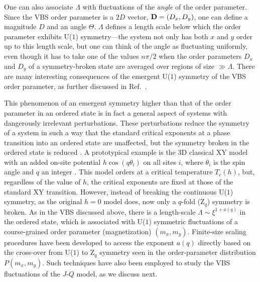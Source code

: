 \documentclass[range]{ar2e}
\begin{document}
One can also associate $\Lambda$ with fluctuations of the {\it angle} of the order parameter. Since the VBS order parameter is a $2D$ vector, ${\bf D}= (D_x,D_y)$, 
one can define a magnitude $D$ and an angle $\Theta$. $\Lambda$ defines a length scale below which the order parameter exhibits U($1$) symmetry---the system
not only has both $x$ and $y$ order up to this length scale, but one can think of the angle as fluctuating uniformly, even though it has to take one of the 
values $n\pi/2$ when the order parameters $D_x$ and $D_y$ of a symmetry-broken state are averaged over regions of size $\gg \Lambda$. There are many interesting 
consequences of the emergent U($1$) symmetry of the VBS order parameter, as further discussed in Ref.~\cite{Sandvik12}.

This phenomenon of an emergent symmetry higher than that of the order parameter in an ordered state is in fact a general aspect of systems with 
dangerously irrelevant perturbations. These perturbations reduce the symmetry of a system in such a way that the standard critical exponents 
at a phase transition into an ordered state are unaffected, but the symmetry broken in the ordered state is reduced \cite{Jose77,Oshikawa00}. A 
prototypical example is the 3D classical XY model with an added on-site potential $h\cos(q\theta_i)$ on all sites $i$, where $\theta_i$ is the spin 
angle and $q$ an integer \cite{Carmona00}. This model orders at a critical temperature $T_c(h)$, but, regardless of the value of $h$, the critical exponents 
are fixed at those of the standard XY transition. However, instead of breaking the continuous U($1$) symmetry, as the original $h=0$ model does, 
now only a $q$-fold (Z$_q$) symmetry is broken. As in the VBS discussed above, there is a length-scale $\Lambda \sim \xi^{1+a(q)}$ in the ordered state, which 
is associated with U($1$) symmetric fluctuations of a course-grained order parameter (magnetization) $(m_x,m_y)$. Finite-size scaling procedures have been 
developed \cite{Lou07} to access the exponent $a(q)$ directly based on the cross-over from U($1$) to Z$_q$ symmetry seen in the order-parameter distribution 
$P(m_x,m_y)$. Such techniques have also been employed to study the VBS fluctuations of the $J$-$Q$ model, as we discuss next.
\end{document}
